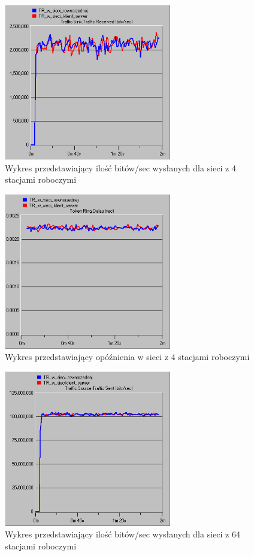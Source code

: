 \documentclass{article}
\begin{document}
\begin{figure}[H]
  \centering
  \includegraphics[width=0.65\textwidth]{screens/4_recv.png}
 \caption{Wykres przedstawiający ilość bitów/sec wysłanych dla sieci z 4 stacjami roboczymi}
 \label{fig:4r}
\end{figure}

\begin{figure}[H]
  \centering
  \includegraphics[width=0.65\textwidth]{screens/4_delay.png}
 \caption{Wykres przedstawiający opóźnienia w sieci z 4 stacjami roboczymi}
 \label{fig:4d}
\end{figure}

\begin{figure}[H]
  \centering
  \includegraphics[width=0.65\textwidth]{screens/64_sent.png}
 \caption{Wykres przedstawiający ilość bitów/sec wysłanych dla sieci z 64 stacjami roboczymi}
 \label{fig:64s}
\end{figure}
\end{document}
